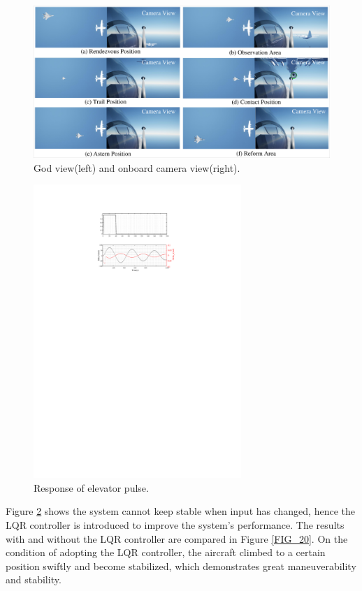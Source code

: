 \begin{figure}[htp]
	\centering
	\includegraphics[width=1\textwidth]{Figures/Figs_Ch5/Fig18.pdf}
	\caption{God view(left) and onboard camera view(right).}\label{FIG_18}
\end{figure}

\begin{figure}[htpb]
	\centering
	\includegraphics[width=0.7\textwidth]{Figures/Figs_Ch5/Fig19.pdf}
	\caption{Response of elevator pulse.}\label{FIG_19}
\end{figure}

Figure \ref{FIG_19} shows the system cannot keep stable when input has changed, hence the LQR controller is introduced to improve the system's performance. The results with and without the LQR controller are compared in Figure \ref{FIG_20}. On the condition of adopting the LQR controller, the aircraft climbed to a certain position swiftly and become stabilized, which demonstrates great maneuverability and stability.

